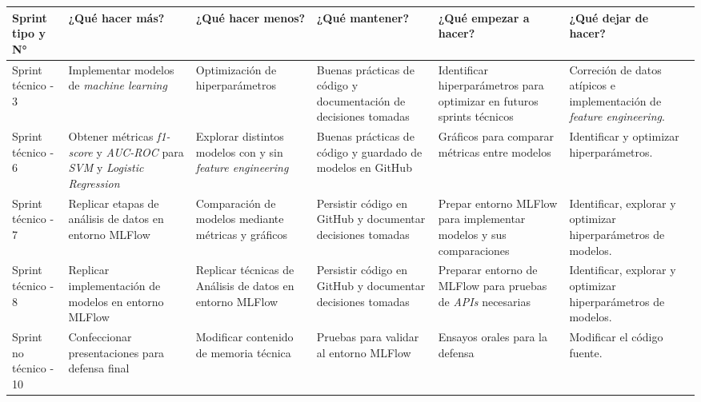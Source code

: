 \documentclass[
11pt, %
]{charter}
\begin{document}
\begin{table}[htpb]
\renewcommand{\arraystretch}{1.4}
\begin{tabular}{|>{\raggedright\arraybackslash}p{1.8cm}|
                >{\raggedright\arraybackslash}p{2.3cm}|
                >{\raggedright\arraybackslash}p{2.3cm}|
                >{\raggedright\arraybackslash}p{2.3cm}|
                >{\raggedright\arraybackslash}p{2.3cm}|
                >{\raggedright\arraybackslash}p{2.3cm}|}
\hline
\rowcolor[HTML]{CCCCCC} 
\textbf{Sprint tipo y N°} & \textbf{¿Qué hacer más?} & \textbf{¿Qué hacer menos?} & \textbf{¿Qué mantener?} & \textbf{¿Qué empezar a hacer?} & \textbf{¿Qué dejar de hacer?} \\
\hline
Sprint técnico - 3 & Implementar modelos de \textit{machine learning} & Optimización de hiperparámetros & Buenas prácticas de código y documentación de decisiones tomadas & Identificar hiperparámetros para optimizar en futuros sprints técnicos & Correción de datos atípicos e implementación de \textit{feature engineering}. \\ \hline
Sprint técnico - 6 & Obtener métricas \textit{f1-score} y \textit{AUC-ROC} para \textit{SVM} y \textit{Logistic Regression} & Explorar distintos modelos con y sin \textit{feature engineering} & Buenas prácticas de código y guardado de modelos en GitHub & Gráficos para comparar métricas entre modelos & Identificar y optimizar hiperparámetros. \\ \hline
Sprint técnico - 7 & Replicar etapas de análisis de datos en entorno MLFlow & Comparación de modelos mediante métricas y gráficos & Persistir código en GitHub y documentar decisiones tomadas & Prepar entorno MLFlow para implementar modelos y sus comparaciones & Identificar, explorar y optimizar hiperparámetros de modelos. \\ \hline
Sprint técnico - 8 & Replicar implementación de modelos en entorno MLFlow & Replicar técnicas de Análisis de datos en entorno MLFlow & Persistir código en GitHub y documentar decisiones tomadas & Preparar entorno de MLFlow para pruebas de \textit{APIs} necesarias & Identificar, explorar y optimizar hiperparámetros de modelos. \\ \hline
Sprint no técnico - 10 & Confeccionar presentaciones para defensa final & Modificar contenido de memoria técnica & Pruebas para validar al entorno MLFlow & Ensayos orales para la defensa & Modificar el código fuente. \\ \hline
\end{tabular}
\end{table}
\end{document}
